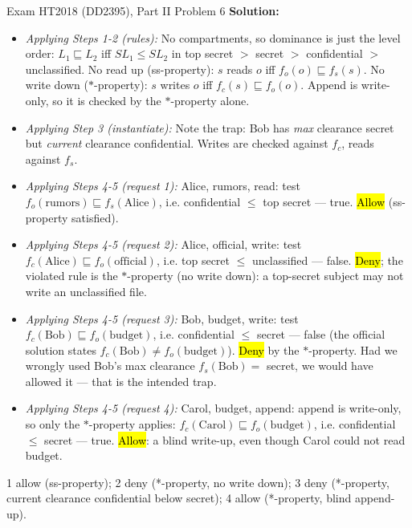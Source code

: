 \documentclass[12pt, a4paper]{article}
\newcommand{\imp}[1]{\hl{#1}}                       %
\begin{document}
\begin{practicebox}{Exam HT2018 (DD2395), Part II Problem 6}
\textbf{Solution:}
\begin{itemize}
    \item \textit{Applying Steps 1-2 (rules):} No compartments, so dominance is just the level order: $L_1 \sqsubseteq L_2$ iff $SL_1 \leq SL_2$ in top secret $>$ secret $>$ confidential $>$ unclassified.
    No read up (ss-property): $s$ reads $o$ iff $f_o(o) \sqsubseteq f_s(s)$. No write down ($*$-property): $s$ writes $o$ iff $f_c(s) \sqsubseteq f_o(o)$. Append is write-only, so it is checked by the $*$-property alone.
    \item \textit{Applying Step 3 (instantiate):} Note the trap: Bob has \emph{max} clearance secret but \emph{current} clearance confidential. Writes are checked against $f_c$, reads against $f_s$.
    \item \textit{Applying Steps 4-5 (request 1):} Alice, rumors, read: test $f_o(\text{rumors}) \sqsubseteq f_s(\text{Alice})$, i.e. confidential $\leq$ top secret --- true. \imp{Allow} (ss-property satisfied).
    \item \textit{Applying Steps 4-5 (request 2):} Alice, official, write: test $f_c(\text{Alice}) \sqsubseteq f_o(\text{official})$, i.e. top secret $\leq$ unclassified --- false. \imp{Deny}; the violated rule is the $*$-property (no write down): a top-secret subject may not write an unclassified file.
    \item \textit{Applying Steps 4-5 (request 3):} Bob, budget, write: test $f_c(\text{Bob}) \sqsubseteq f_o(\text{budget})$, i.e. confidential $\leq$ secret --- false (the official solution states $f_c(\text{Bob}) \neq f_o(\text{budget})$).
    \imp{Deny} by the $*$-property. Had we wrongly used Bob's max clearance $f_s(\text{Bob}) = $ secret, we would have allowed it --- that is the intended trap.
    \item \textit{Applying Steps 4-5 (request 4):} Carol, budget, append: append is write-only, so only the $*$-property applies: $f_c(\text{Carol}) \sqsubseteq f_o(\text{budget})$, i.e. confidential $\leq$ secret --- true. \imp{Allow}: a blind write-up, even though Carol could not read budget.
\end{itemize}

\begin{answerbox}
1 allow (ss-property); 2 deny (*-property, no write down); 3 deny (*-property, current clearance confidential below secret); 4 allow (*-property, blind append-up).
\end{answerbox}
\end{practicebox}
\end{document}
